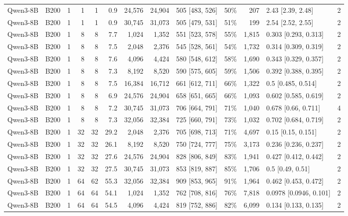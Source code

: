 \begin{landscape}
\begin{longtable}{llrrrrrrlrrlr}
Qwen3-8B & B200 & 1 & 1 & 1 & 0.9 & 24,576 & 24,904 & 505 {[}483, 526{]} & 50\% & 207 & 2.43 {[}2.39, 2.48{]} & 2 \\
Qwen3-8B & B200 & 1 & 1 & 1 & 0.9 & 30,745 & 31,073 & 505 {[}479, 531{]} & 51\% & 199 & 2.54 {[}2.52, 2.55{]} & 2 \\
Qwen3-8B & B200 & 1 & 8 & 8 & 7.7 & 1,024 & 1,352 & 551 {[}523, 578{]} & 55\% & 1,815 & 0.303 {[}0.293, 0.313{]} & 2 \\
Qwen3-8B & B200 & 1 & 8 & 8 & 7.5 & 2,048 & 2,376 & 545 {[}528, 561{]} & 54\% & 1,732 & 0.314 {[}0.309, 0.319{]} & 2 \\
Qwen3-8B & B200 & 1 & 8 & 8 & 7.6 & 4,096 & 4,424 & 580 {[}548, 612{]} & 58\% & 1,690 & 0.343 {[}0.329, 0.357{]} & 2 \\
Qwen3-8B & B200 & 1 & 8 & 8 & 7.3 & 8,192 & 8,520 & 590 {[}575, 605{]} & 59\% & 1,506 & 0.392 {[}0.388, 0.395{]} & 2 \\
Qwen3-8B & B200 & 1 & 8 & 8 & 7.5 & 16,384 & 16,712 & 661 {[}612, 711{]} & 66\% & 1,322 & 0.5 {[}0.485, 0.514{]} & 2 \\
Qwen3-8B & B200 & 1 & 8 & 8 & 6.9 & 24,576 & 24,904 & 658 {[}651, 665{]} & 66\% & 1,093 & 0.602 {[}0.585, 0.619{]} & 2 \\
Qwen3-8B & B200 & 1 & 8 & 8 & 7.2 & 30,745 & 31,073 & 706 {[}664, 791{]} & 71\% & 1,040 & 0.678 {[}0.66, 0.711{]} & 4 \\
Qwen3-8B & B200 & 1 & 8 & 8 & 7.3 & 32,056 & 32,384 & 725 {[}660, 791{]} & 73\% & 1,032 & 0.702 {[}0.684, 0.719{]} & 2 \\
Qwen3-8B & B200 & 1 & 32 & 32 & 29.2 & 2,048 & 2,376 & 705 {[}698, 713{]} & 71\% & 4,697 & 0.15 {[}0.15, 0.151{]} & 2 \\
Qwen3-8B & B200 & 1 & 32 & 32 & 26.1 & 8,192 & 8,520 & 750 {[}724, 777{]} & 75\% & 3,173 & 0.236 {[}0.236, 0.237{]} & 2 \\
Qwen3-8B & B200 & 1 & 32 & 32 & 27.6 & 24,576 & 24,904 & 828 {[}806, 849{]} & 83\% & 1,941 & 0.427 {[}0.412, 0.442{]} & 2 \\
Qwen3-8B & B200 & 1 & 32 & 32 & 27.5 & 30,745 & 31,073 & 853 {[}819, 887{]} & 85\% & 1,706 & 0.5 {[}0.49, 0.51{]} & 2 \\
Qwen3-8B & B200 & 1 & 64 & 62 & 55.3 & 32,056 & 32,384 & 909 {[}853, 965{]} & 91\% & 1,964 & 0.462 {[}0.453, 0.472{]} & 2 \\
Qwen3-8B & B200 & 1 & 64 & 64 & 54.1 & 1,024 & 1,352 & 762 {[}708, 816{]} & 76\% & 7,818 & 0.0978 {[}0.0946, 0.101{]} & 2 \\
Qwen3-8B & B200 & 1 & 64 & 64 & 54.5 & 4,096 & 4,424 & 819 {[}752, 886{]} & 82\% & 6,099 & 0.134 {[}0.133, 0.135{]} & 2 \\

\end{longtable}
\end{landscape}
